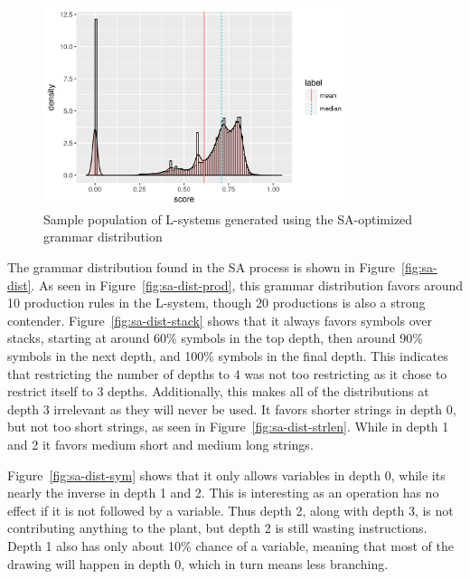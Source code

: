 \begin{figure}
    \centering
    \includegraphics[width=0.8\textwidth]{figures/sa-population}
    \caption{Sample population of L-systems generated using the SA-optimized grammar distribution}
    \label{fig:sa-population}
\end{figure}

The grammar distribution found in the SA process is shown in Figure~\ref{fig:sa-dist}.
As seen in Figure~\ref{fig:sa-dist-prod}, this grammar distribution favors around 10 production rules in the L-system, though 20 productions is also a strong contender.
Figure~\ref{fig:sa-dist-stack} shows that it always favors symbols over stacks, starting at around 60\% symbols in the top depth, then around 90\% symbols in the next depth, and 100\% symbols in the final depth.
This indicates that restricting the number of depths to 4 was not too restricting as it chose to restrict itself to 3 depths.
Additionally, this makes all of the distributions at depth 3 irrelevant as they will never be used.
It favors shorter strings in depth 0, but not too short strings, as seen in Figure~\ref{fig:sa-dist-strlen}.
While in depth 1 and 2 it favors medium short and medium long strings.

Figure~\ref{fig:sa-dist-sym} shows that it only allows variables in depth 0, while its nearly the inverse in depth 1 and 2.
This is interesting as an operation has no effect if it is not followed by a variable.
Thus depth 2, along with depth 3, is not contributing anything to the plant, but depth 2 is still wasting instructions.
Depth 1 also has only about 10\% chance of a variable, meaning that most of the drawing will happen in depth 0, which in turn means less branching.


